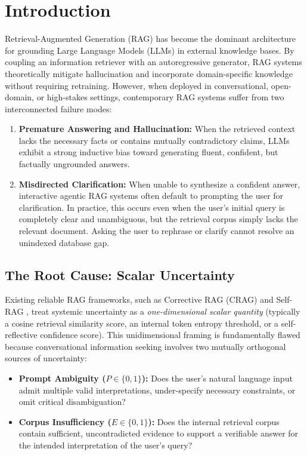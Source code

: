 \section{Introduction}
\label{sec:introduction}

Retrieval-Augmented Generation (RAG) has become the dominant architecture for grounding Large Language Models (LLMs) in external knowledge bases\cite{lewis2020retrieval}. By coupling an information retriever with an autoregressive generator, RAG systems theoretically mitigate hallucination and incorporate domain-specific knowledge without requiring retraining. However, when deployed in conversational, open-domain, or high-stakes settings, contemporary RAG systems suffer from two interconnected failure modes:
\begin{enumerate}
    \item \textbf{Premature Answering and Hallucination:} When the retrieved context lacks the necessary facts or contains mutually contradictory claims, LLMs exhibit a strong inductive bias toward generating fluent, confident, but factually ungrounded answers.
    \item \textbf{Misdirected Clarification:} When unable to synthesize a confident answer, interactive agentic RAG systems often default to prompting the user for clarification. In practice, this occurs even when the user's initial query is completely clear and unambiguous, but the retrieval corpus simply lacks the relevant document. Asking the user to rephrase or clarify cannot resolve an unindexed database gap.
\end{enumerate}

\subsection{The Root Cause: Scalar Uncertainty}
Existing reliable RAG frameworks, such as Corrective RAG (CRAG)\cite{yan2024corrective} and Self-RAG \cite{asai2024self}, treat systemic uncertainty as a \emph{one-dimensional scalar quantity} (typically a cosine retrieval similarity score, an internal token entropy threshold, or a self-reflective confidence score). This unidimensional framing is fundamentally flawed because conversational information seeking involves two mutually orthogonal sources of uncertainty:
\begin{itemize}
    \item \textbf{Prompt Ambiguity ($P \in \{0, 1\}$):} Does the user's natural language input admit multiple valid interpretations, under-specify necessary constraints, or omit critical disambiguation?
    \item \textbf{Corpus Insufficiency ($E \in \{0, 1\}$):} Does the internal retrieval corpus contain sufficient, uncontradicted evidence to support a verifiable answer for the intended interpretation of the user's query?
\end{itemize}

